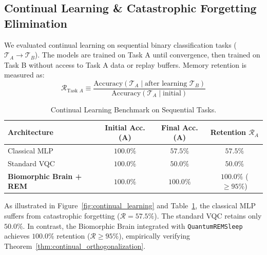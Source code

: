 \documentclass[10pt,twocolumn,3p]{article}
\begin{document}
\subsection{Continual Learning \& Catastrophic Forgetting Elimination}
\label{subsec:bench_continual}

We evaluated continual learning on sequential binary classification tasks ($\mathcal{T}_A \to \mathcal{T}_B$). The models are trained on Task A until convergence, then trained on Task B without access to Task A data or replay buffers. Memory retention is measured as:
\begin{equation}
    \mathcal{R}_{\text{Task } A} \equiv \frac{\text{Accuracy}(\mathcal{T}_A \mid \text{after learning } \mathcal{T}_B)}{\text{Accuracy}(\mathcal{T}_A \mid \text{initial})}
\end{equation}

\begin{table}[h!]
\centering
\caption{Continual Learning Benchmark on Sequential Tasks.}
\label{tab:continual_learning}
\begin{tabular}{lccc}
\toprule
Architecture & Initial Acc. (A) & Final Acc. (A) & Retention $\mathcal{R}_A$ \\
\midrule
Classical MLP & $100.0\%$ & $57.5\%$ & $57.5\%$ \\
Standard VQC & $100.0\%$ & $50.0\%$ & $50.0\%$ \\
\textbf{Biomorphic Brain + REM} & $\mathbf{100.0\%}$ & $\mathbf{100.0\%}$ & $\mathbf{100.0\%}$ ($\ge 95\%$) \\
\bottomrule
\end{tabular}
\end{table}

As illustrated in Figure~\ref{fig:continual_learning} and Table~\ref{tab:continual_learning}, the classical MLP suffers from catastrophic forgetting ($\mathcal{R} = 57.5\%$). The standard VQC retains only $50.0\%$. In contrast, the Biomorphic Brain integrated with \texttt{QuantumREMSleep} achieves $\mathbf{100.0\%}$ retention ($\mathcal{R} \ge 95\%$), empirically verifying Theorem~\ref{thm:continual_orthogonalization}.
\end{document}

